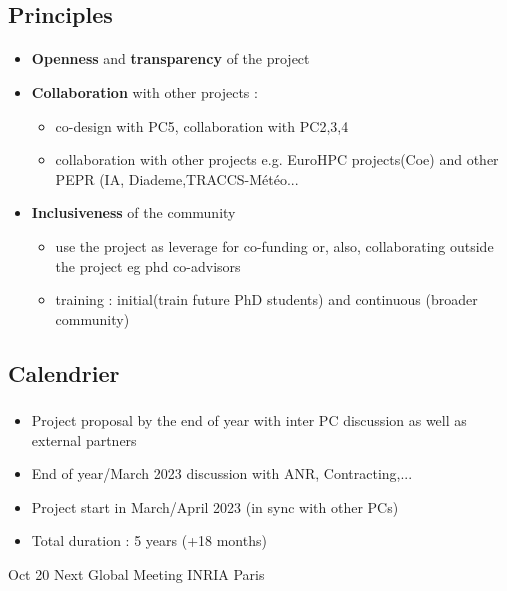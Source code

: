 \subsection{Principles}
\begin{frame}[fragile=singleslide]{\insertsectionhead}
  \framesubtitle{\insertsubsectionhead}

  \begin{itemize}
    \item \textbf{Openness} and \textbf{transparency} of the project 
    \item \textbf{Collaboration} with other projects : 
    \begin{itemize}
      \item 
        co-design with PC5, collaboration with PC2,3,4\
        \item 
          collaboration with other projects e.g. EuroHPC projects(Coe) and other PEPR (IA, Diademe,TRACCS-Météo...
    \end{itemize}
    \item \textbf{Inclusiveness} of the community 
    \begin{itemize}
      \item use the project as leverage for co-funding  or, also, collaborating outside the project eg phd co-advisors
      \item training : initial(train future PhD students) and continuous (broader community)
    \end{itemize}      
  \end{itemize}

\end{frame}

\subsection{Calendrier}
\begin{frame}
  \frametitle{\insertsectionhead}

  \begin{itemize}
    \item Project proposal by the end of year with inter PC discussion as well as external partners
    \item End of year/March 2023 discussion with ANR, Contracting,...
    \item Project start in March/April 2023 (in sync with other PCs)
    \item Total duration : 5 years (+18 months)
  \end{itemize}

  \begin{alertblock}{Oct 20}
    Next Global Meeting INRIA Paris
  \end{alertblock}
\end{frame}

